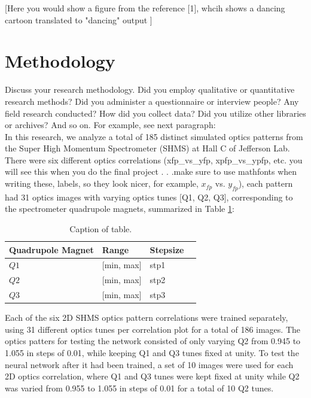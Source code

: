 \documentclass[conference]{IEEEtran}
\begin{document}
[Here you would show a figure from the reference [1], whcih shows a dancing cartoon translated to "dancing" output ]

\section{Methodology}
Discuss your research methodology. Did you employ qualitative or quantitative research methods?
Did you administer a questionnaire or interview people? Any field research conducted? How did you collect data?
Did you utilize other libraries or archives? And so on. For example, see next paragraph:\\
\indent In this research, we analyze a total of 185 distinct simulated optics patterns from the Super High Momentum Spectrometer (SHMS) at Hall C of Jefferson Lab.
There were six different optics correlations (xfp\_vs\_yfp, xpfp\_vs\_ypfp, etc. you will see this when you do the final project . . .make sure to use mathfonts when writing these,
labels, so they look nicer, for example, $x_{fp}$ vs. $y_{fp}$), each pattern had 31 optics images with varying optics tunes [Q1, Q2, Q3], corresponding to the spectrometer quadrupole magnets, summarized in Table \ref{tab:tune_stpSize}:

\begin{table}[h]
	\begin{center}
		\begin{tabular}{llll} %
                  \hline
                  Quadrupole Magnet & Range & Stepsize \\
                  \hline\hline
	          $Q1$ & [min, max] & stp1  \\
                  $Q2$ & [min, max] & stp2  \\
                  $Q3$ & [min, max] & stp3  \\                       
                  \hline 
		\end{tabular}
	\end{center}
	\caption{Caption of table.}
	\label{tab:tune_stpSize}
\end{table}

Each of the six 2D SHMS optics pattern correlations were trained separately, using 31 different optics tunes
per correlation plot for a total of 186 images. The optics patters for testing the network consisted of only
varying Q2 from 0.945 to 1.055 in steps of 0.01, while keeping Q1 and Q3 tunes fixed at unity.
To test the neural network after it had been trained, a set of 10 images were used for each 2D optics correlation, where Q1 and Q3
tunes were kept fixed at unity while Q2 was varied from 0.955 to 1.055 in steps of 0.01 for a total of 10 Q2 tunes.\\
\end{document}

